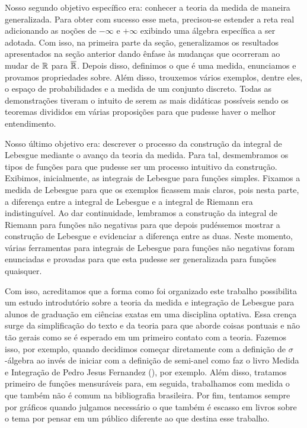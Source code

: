 	Nosso segundo objetivo específico era: conhecer a teoria da medida de maneira generalizada.
	Para obter com sucesso esse meta, precisou-se estender a reta real adicionando as noções de $-\infty$ e $+\infty$ exibindo uma álgebra específica a ser adotada.
	Com isso, na primeira parte da seção, generalizamos os resultados apresentados na seção anterior dando ênfase às mudanças que ocorreram ao mudar de $\mathbb{R}$ para $\overline{\mathbb{R}}$.
	Depois disso, definimos o que é uma medida, enunciamos e provamos propriedades sobre.
	Além disso, trouxemos vários exemplos, dentre eles, o espaço de probabilidades e a medida de um conjunto discreto.
	Todas as demonstrações tiveram o intuito de serem as mais didáticas possíveis sendo os teoremas divididos em várias proposições para que pudesse haver o melhor entendimento.
	
	Nosso último objetivo era: descrever o processo da construção da integral de Lebesgue mediante o avanço da teoria da medida.
	Para tal, desmembramos os tipos de funções para que pudesse ser um processo intuitivo da construção.
	Exibimos, inicialmente, as integrais de Lebesgue para funções simples.
	Fixamos a medida de Lebesgue para que os exemplos ficassem mais claros, pois nesta parte, a diferença entre a integral de Lebesgue e a integral de Riemann era indistinguível. 
	Ao dar continuidade, lembramos a construção da integral de Riemann para funções não negativas para que depois pudéssemos mostrar a construção de Lebesgue e evidenciar a diferença entre as duas.
	Neste momento, várias ferramentas para integrais de Lebesgue para funções não negativas foram enunciadas e provadas para que esta pudesse ser generalizada para funções quaisquer.  
   	
   	Com isso, acreditamos que a forma como foi organizado este trabalho possibilita um estudo introdutório sobre a teoria da medida e integração de Lebesgue para alunos de graduação em ciências exatas em uma disciplina optativa.
   	Essa crença surge da simplificação do texto e da teoria para que aborde coisas pontuais e não tão gerais como se é esperado em um primeiro contato com a teoria. 
   	Fazemos isso, por exemplo, quando decidimos começar diretamente com a definição de $\sigma$-álgebra ao invés de iniciar com a definição de semi-anel como faz o livro Medida e Integração de Pedro Jesus Fernandez (\citeyear{pedro}), por exemplo.
   	Além disso, tratamos primeiro de funções mensuráveis para, em seguida, trabalhamos com medida o que também não é comum na bibliografia brasileira.
   	Por fim, tentamos sempre por gráficos quando julgamos necessário o que também é escasso em livros sobre o tema por pensar em um público diferente ao que destina esse trabalho. 
   	 
    
    
    
    
    
    
    
    
    
    
    
    
    
    
    
    
    
    
